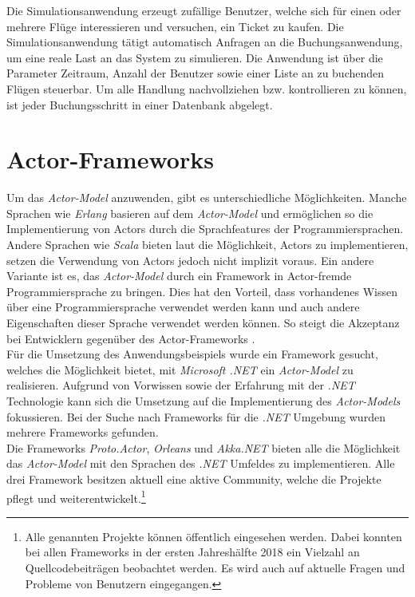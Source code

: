Die Simulationsanwendung erzeugt zufällige Benutzer, welche sich für einen oder mehrere Flüge interessieren und versuchen, ein Ticket zu kaufen. Die Simulationsanwendung tätigt automatisch Anfragen an die Buchungsanwendung, um eine reale Last an das System zu simulieren. Die Anwendung ist über die Parameter Zeitraum, Anzahl der Benutzer sowie einer Liste an zu buchenden Flügen steuerbar. 
Um alle Handlung nachvollziehen bzw. kontrollieren zu können, ist jeder Buchungsschritt in einer Datenbank abgelegt.


\section{Actor-Frameworks}\label{sec:ActorFrameworks}
Um das \textit{Actor-Model} anzuwenden, gibt es unterschiedliche Möglichkeiten. Manche Sprachen wie \textit{Erlang} basieren auf dem \textit{Actor-Model} und ermöglichen so die Implementierung von Actors \citep{actorComparativeAnalysis} durch die Sprachfeatures der Programmiersprachen. Andere Sprachen wie \textit{Scala} bieten laut \cite{haller2012actors} die Möglichkeit, Actors zu implementieren, setzen die Verwendung von Actors jedoch nicht implizit voraus. Ein andere Variante ist es, das \textit{Actor-Model} durch ein Framework in Actor-fremde Programmiersprache zu bringen. Dies hat den Vorteil, dass vorhandenes Wissen über eine Programmiersprache verwendet werden kann und auch andere Eigenschaften dieser Sprache verwendet werden können. So steigt die Akzeptanz bei Entwicklern gegenüber des Actor-Frameworks \citep{lee2006problem}. \\
Für die Umsetzung des Anwendungsbeispiels wurde ein Framework gesucht, welches die Möglichkeit bietet, mit \textit{Microsoft .NET} ein \textit{Actor-Model} zu realisieren. Aufgrund von Vorwissen sowie der Erfahrung mit der \textit{.NET} Technologie kann sich die Umsetzung auf die Implementierung des \textit{Actor-Models} fokussieren. Bei der Suche nach Frameworks für die \textit{.NET} Umgebung wurden mehrere Frameworks gefunden. \\
Die Frameworks \textit{Proto.Actor}, \textit{Orleans} und \textit{Akka.NET} bieten alle die Möglichkeit das \textit{Actor-Model} mit den Sprachen des \textit{.NET} Umfeldes zu implementieren. Alle drei Framework besitzen aktuell eine aktive Community, welche die Projekte pflegt und weiterentwickelt.\footnote{Alle genannten Projekte können öffentlich eingesehen werden. Dabei konnten bei allen Frameworks in der ersten Jahreshälfte 2018 ein Vielzahl an Quellcodebeiträgen beobachtet werden. Es wird auch auf aktuelle Fragen und Probleme von Benutzern eingegangen.}

